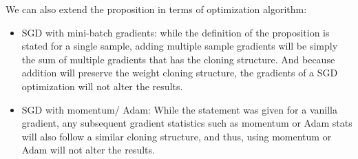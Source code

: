 \documentclass{article}
\begin{document}
We can also extend the proposition in terms of optimization algorithm:
\begin{itemize}
    \item SGD with mini-batch gradients: while the definition of the proposition is stated for a single sample, adding multiple sample gradients will be simply the sum of multiple gradients that has the cloning structure. And because addition will preserve the weight cloning structure, the gradients of a SGD optimization will not alter the results. 
    \item SGD with momentum/ Adam: While the statement was given for a vanilla gradient, any subsequent gradient statistics such as momentum or Adam stats will also follow a similar cloning structure, and thus, using momentum or Adam will not alter the results.  
\end{itemize}
\end{document}
